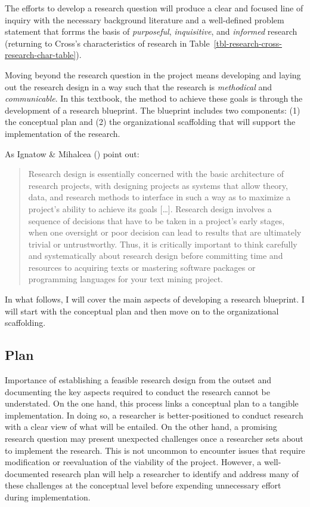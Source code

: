 \documentclass[
  letterpaper,
]{book}
\theoremstyle{definition}
\theoremstyle{remark}
\begin{document}
The efforts to develop a research question will produce a clear and
focused line of inquiry with the necessary background literature and a
well-defined problem statement that forrms the basis of
\emph{purposeful}, \emph{inquisitive}, and \emph{informed} research
(returning to Cross's characteristics of research in
Table~\ref{tbl-research-cross-research-char-table}).

Moving beyond the research question in the project means developing and
laying out the research design in a way such that the research is
\emph{methodical} and \emph{communicable}. In this textbook, the method
to achieve these goals is through the development of a research
blueprint. The blueprint includes two components: (1) the conceptual
plan and (2) the organizational scaffolding that will support the
implementation of the research.

As Ignatow \& Mihalcea () point out:

\begin{quote}
Research design is essentially concerned with the basic architecture of
research projects, with designing projects as systems that allow theory,
data, and research methods to interface in such a way as to maximize a
project's ability to achieve its goals {[}\ldots{]}. Research design
involves a sequence of decisions that have to be taken in a project's
early stages, when one oversight or poor decision can lead to results
that are ultimately trivial or untrustworthy. Thus, it is critically
important to think carefully and systematically about research design
before committing time and resources to acquiring texts or mastering
software packages or programming languages for your text mining project.
\end{quote}

In what follows, I will cover the main aspects of developing a research
blueprint. I will start with the conceptual plan and then move on to the
organizational scaffolding.

\subsection{Plan}\label{sec-research-plan}

Importance of establishing a feasible research design from the outset
and documenting the key aspects required to conduct the research cannot
be understated. On the one hand, this process links a conceptual plan to
a tangible implementation. In doing so, a researcher is
better-positioned to conduct research with a clear view of what will be
entailed. On the other hand, a promising research question may present
unexpected challenges once a researcher sets about to implement the
research. This is not uncommon to encounter issues that require
modification or reevaluation of the viability of the project. However, a
well-documented research plan will help a researcher to identify and
address many of these challenges at the conceptual level before
expending unnecessary effort during implementation.
\end{document}
